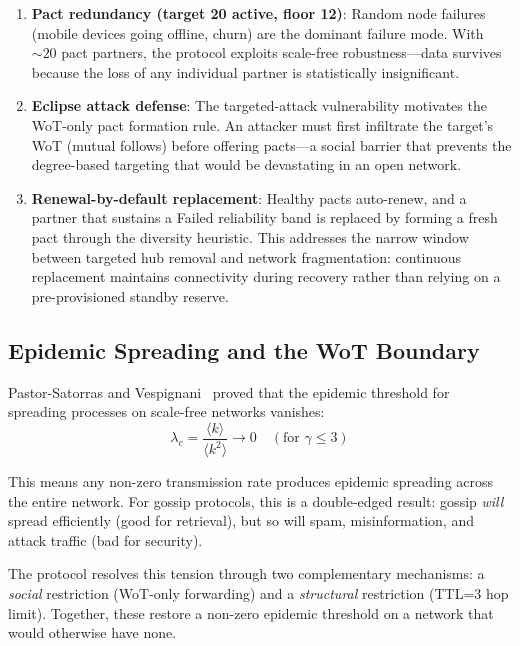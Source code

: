 \documentclass[11pt,a4paper]{article}
\begin{document}
\begin{enumerate}
  \item \textbf{Pact redundancy (target 20 active, floor 12)}: Random node failures (mobile devices going offline, churn) are the dominant failure mode. With ${\sim}20$ pact partners, the protocol exploits scale-free robustness---data survives because the loss of any individual partner is statistically insignificant.
  \item \textbf{Eclipse attack defense}: The targeted-attack vulnerability motivates the WoT-only pact formation rule. An attacker must first infiltrate the target's WoT (mutual follows) before offering pacts---a social barrier that prevents the degree-based targeting that would be devastating in an open network.
  \item \textbf{Renewal-by-default replacement}: Healthy pacts auto-renew, and a partner that sustains a Failed reliability band is replaced by forming a fresh pact through the diversity heuristic. This addresses the narrow window between targeted hub removal and network fragmentation: continuous replacement maintains connectivity during recovery rather than relying on a pre-provisioned standby reserve.
\end{enumerate}

\subsection{Epidemic Spreading and the WoT Boundary}

Pastor-Satorras and Vespignani~\cite{pastor-satorras} proved that the epidemic threshold for spreading processes on scale-free networks vanishes:
\begin{equation}
  \lambda_c = \frac{\langle k \rangle}{\langle k^2 \rangle} \to 0 \quad (\text{for } \gamma \leq 3)
\end{equation}

This means any non-zero transmission rate produces epidemic spreading across the entire network. For gossip protocols, this is a double-edged result: gossip \emph{will} spread efficiently (good for retrieval), but so will spam, misinformation, and attack traffic (bad for security).

The protocol resolves this tension through two complementary mechanisms: a \emph{social} restriction (WoT-only forwarding) and a \emph{structural} restriction (TTL=3 hop limit). Together, these restore a non-zero epidemic threshold on a network that would otherwise have none.
\end{document}
